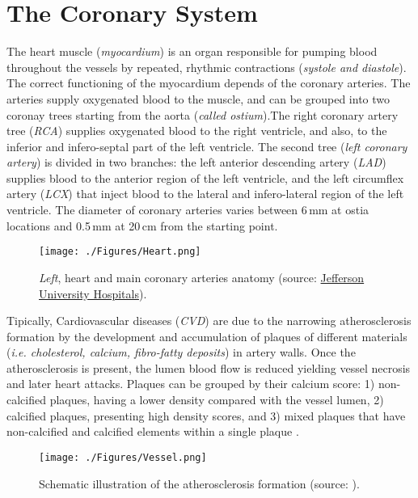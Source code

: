 \section{The Coronary System}
%
The heart muscle (\textit{myocardium}) is an organ responsible for pumping blood throughout the vessels by repeated, rhythmic contractions (\textit{systole and diastole}). The correct functioning of the myocardium depends of the coronary arteries. The arteries supply oxygenated blood to the muscle, and can be grouped into two coronay trees starting from the aorta (\textit{called ostium}).The right coronary artery tree (\textit{RCA}) supplies oxygenated blood to the right ventricle, and also, to the inferior and infero-septal part of the left ventricle. The second tree (\textit{left coronary artery}) is divided in two branches: the left anterior descending artery (\textit{LAD}) supplies blood to the anterior region of the left ventricle, and the left circumflex artery (\textit{LCX}) that inject blood to the lateral and infero-lateral region of the left ventricle. The diameter of coronary arteries varies between 6{\,}mm at ostia locations and 0.5{\,}mm at 20{\,}cm from the starting point.

\begin{figure}[h]
	\centering
		\texttt{[image: ./Figures/Heart.png]}
	\caption[Coronary Arteries Anatomy]{\textit{Left}, heart and main coronary arteries anatomy (source: \href{http://www.jeffersonhospital.org/
Tests-and-Treatments/coronary-artery-bypass-grafting.aspx}{Jefferson University Hospitals}).}
	\label{fig:He}
\end{figure}

Tipically, Cardiovascular diseases (\textit{CVD}) are due to the narrowing atherosclerosis formation by the development and accumulation of plaques of different materials (\textit{i.e. cholesterol, calcium, fibro-fatty deposits}) in artery walls. Once the atherosclerosis is present, the lumen blood flow is reduced yielding vessel necrosis and later heart attacks. Plaques can be grouped by their calcium score: 1) non-calcified plaques, having a lower density compared with the vessel lumen, 2) calcified plaques, presenting high density scores, and 3) mixed plaques that have non-calcified and calcified elements within a single plaque \citep{Pundziute2007}.

\begin{figure}[h]
	\centering
		\texttt{[image: ./Figures/Vessel.png]}
	\caption[Cardiovascular Diseases]{Schematic illustration of the atherosclerosis formation (source:  \citep{Schaap2010Thesis}).}
	\label{fig:ves_plaq}
\end{figure}

